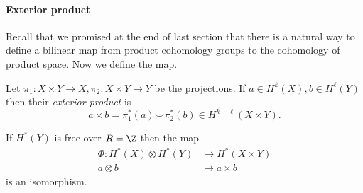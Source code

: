 \documentclass[a4paper]{article}
\newcommand*{\cp}{\smile} %
\begin{document}
\paragraph{Exterior product}

Recall that we promised at the end of last section that there is a natural way to define a bilinear map from product cohomology groups to the cohomology of product space. Now we define the map. 

\begin{definition}
  Let \(\pi_1: X \times Y \to X, \pi_2: X \times Y \to Y\) be the projections. If \(a \in H^k(X), b \in H^\ell(Y)\) then their \emph{exterior product} is
  \[
    a \times b = \pi_1^*(a) \cp \pi_2^*(b) \in H^{k + \ell}(X \times Y).
  \]
\end{definition}

\begin{theorem}
  If \(H^*(Y)\) is free over \(R = \Z\) then the map
  \begin{align*}
    \Phi: H^*(X) \otimes H^*(Y) &\to H^*(X \times Y) \\
    a \otimes b &\mapsto a \times b
  \end{align*}
  is an isomorphism.
\end{theorem}
\end{document}
